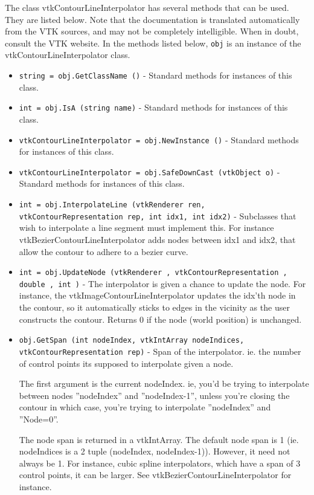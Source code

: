 The class vtkContourLineInterpolator has several methods that can be used.
  They are listed below.
Note that the documentation is translated automatically from the VTK sources,
and may not be completely intelligible.  When in doubt, consult the VTK website.
In the methods listed below, \verb|obj| is an instance of the vtkContourLineInterpolator class.
\begin{itemize}
\item  \verb|string = obj.GetClassName ()| -  Standard methods for instances of this class.

\item  \verb|int = obj.IsA (string name)| -  Standard methods for instances of this class.

\item  \verb|vtkContourLineInterpolator = obj.NewInstance ()| -  Standard methods for instances of this class.

\item  \verb|vtkContourLineInterpolator = obj.SafeDownCast (vtkObject o)| -  Standard methods for instances of this class.

\item  \verb|int = obj.InterpolateLine (vtkRenderer ren, vtkContourRepresentation rep, int idx1, int idx2)| -  Subclasses that wish to interpolate a line segment must implement this.
 For instance vtkBezierContourLineInterpolator adds nodes between idx1
 and idx2, that allow the contour to adhere to a bezier curve.

\item  \verb|int = obj.UpdateNode (vtkRenderer , vtkContourRepresentation , double , int )| -  The interpolator is given a chance to update the node. For instance, the
 vtkImageContourLineInterpolator updates the idx'th node in the contour, 
 so it automatically sticks to edges in the vicinity as the user 
 constructs the contour. 
 Returns 0 if the node (world position) is unchanged.

\item  \verb|obj.GetSpan (int nodeIndex, vtkIntArray nodeIndices, vtkContourRepresentation rep)| -  Span of the interpolator. ie. the number of control points its supposed
 to interpolate given a node.

 The first argument is the current nodeIndex.
 ie, you'd be trying to interpolate between nodes ''nodeIndex'' and 
 ''nodeIndex-1'', unless you're closing the contour in which case, you're
 trying to interpolate ''nodeIndex'' and ''Node=0''. 

 The node span is returned in a vtkIntArray. The default node span is 1 
 (ie. nodeIndices is a 2 tuple (nodeIndex, nodeIndex-1)). However, it 
 need not always be 1. For instance, cubic spline interpolators, which 
 have a span of 3 control points, it can be larger. See
 vtkBezierContourLineInterpolator for instance.

\end{itemize}
